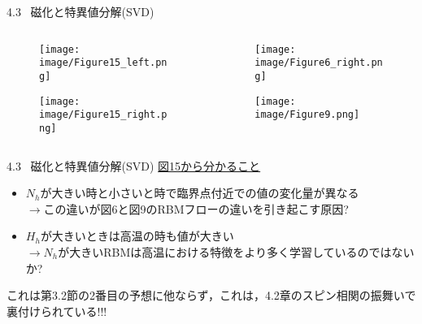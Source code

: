 \documentclass[dvipdfmx,8pt]{beamer}
\begin{document}
\begin{frame}[t]{4.3 \ 磁化と特異値分解(SVD)}
  \begin{columns}
    \begin{column}{0.5\textwidth}
      \begin{figure}
        \begin{center}
          \texttt{[image: image/Figure15\_left.png]}
        \end{center}
      \end{figure}
      \begin{figure}
        \begin{center}
          \texttt{[image: image/Figure15\_right.png]}
        \end{center}
      \end{figure}
    \end{column}
    \begin{column}{0.5\textwidth}
      \begin{figure}
        \begin{center}
          \texttt{[image: image/Figure6\_right.png]}
        \end{center}
      \end{figure}
      \begin{figure}
        \begin{center}
          \texttt{[image: image/Figure9.png]}
        \end{center}
      \end{figure}
    \end{column}
  \end{columns}
\end{frame}

\begin{frame}[t]{4.3 \ 磁化と特異値分解(SVD)}
  \underline{図15から分かること}
  \vspace{0.2cm}
  \begin{itemize}
    \item $N_h$が大きい時と小さいと時で臨界点付近での値の変化量が異なる\\
    \vspace{0.2cm}
    $\rightarrow$この違いが図6と図9のRBMフローの違いを引き起こす原因?
    \item $H_h$が大きいときは高温の時も値が大きい\\
    \vspace{0.2cm}
    $\rightarrow$$N_h$が大きいRBMは高温における特徴をより多く学習しているのではないか?
  \end{itemize}
  \vspace{0.2cm}
  これは第3.2節の2番目の予想に他ならず，これは，4.2章のスピン相関の振舞いで裏付けられている!!!
\end{frame}
\end{document}
